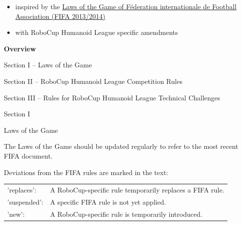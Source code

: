 \documentclass[a4paper]{article}
\begin{document}
\begin{itemize}
\item inspired by the \href{http://resources.fifa.com/mm/document/footballdevelopment/refereeing/02/36/01/11/lawsofthegameweben_neutral.pdf}{\textcolor[rgb]{0.0,0.0,0.49803922}{Laws of the Game of F\'ederation internationale de
Football Association (FIFA 2013/2014)}}
\item with RoboCup Humanoid League specific amendments
\end{itemize}

\setcounter{figure}{0}

\clearpage

{\bfseries\color[rgb]{0.4,0.4,0.4}
Overview}

\bigskip

Section I -- Laws of the Game

\bigskip

Section II -- RoboCup Humanoid League Competition Rules

\bigskip

Section III -- Rules for RoboCup Humanoid League Technical Challenges


\clearpage

\begin{center}
\Huge\bfseries{
\vspace*{3cm}
Section I

\vspace*{2cm}

Laws of the Game}
\end{center}


\vspace*{12cm}

The Laws of the Game should be updated regularly to refer to the most
recent FIFA document.

\bigskip

Deviations from the FIFA rules are marked in the text:

\bigskip
\begin{tabular}{ll}
'replaces': &A RoboCup-specific rule temporarily replaces a FIFA rule. \\
'suspended': &A specific FIFA rule is not yet applied. \\
'new': &A RoboCup-specific rule is temporarily introduced.
\end{tabular}
\end{document}
